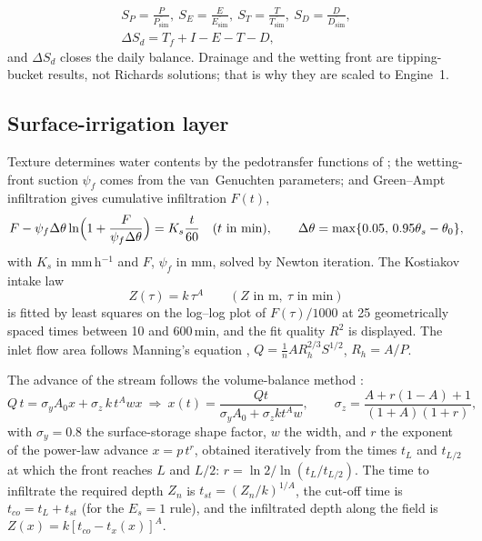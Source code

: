 \documentclass[preprint,12pt]{elsarticle}
\begin{document}
\begin{equation}
\begin{gathered}S_P=\frac{P}{\overline{P_{\mathrm{sim}}}},\ S_E=\frac{E}{\overline{E_{\mathrm{sim}}}},\ S_T=\frac{T}{\overline{T_{\mathrm{sim}}}},\ S_D=\frac{D}{\overline{D_{\mathrm{sim}}}},\\ \Delta S_d=T_f+I-E-T-D,\end{gathered}
\label{eq:scale}
\end{equation}
and $\Delta S_d$ closes the daily balance. Drainage and the wetting front are tipping-bucket results, not Richards solutions; that is why they are scaled to Engine~1.

\subsection{Surface-irrigation layer}
\label{sec:surf}
Texture determines water contents by the pedotransfer functions of \cite{Saxton2006}; the wetting-front suction $\psi_f$ comes from the van~Genuchten parameters; and Green--Ampt infiltration \cite{GreenAmpt1911} gives cumulative infiltration $F(t)$,
\begin{equation}
F-\psi_f\Delta\theta\ln\Bigl(1+\frac{F}{\psi_f\Delta\theta}\Bigr)=K_s\frac{t}{60}\quad(t\text{ in min}),\qquad \Delta\theta=\max\{0.05,\,0.95\theta_s-\theta_0\},
\label{eq:GA}
\end{equation}
with $K_s$ in mm\,h$^{-1}$ and $F$, $\psi_f$ in mm, solved by Newton iteration. The Kostiakov intake law \cite{Kostiakov1932}
\begin{equation}
Z(\tau)=k\,\tau^{A}\qquad(Z\text{ in m},\ \tau\text{ in min})
\label{eq:kost}
\end{equation}
is fitted by least squares on the log--log plot of $F(\tau)/1000$ at 25 geometrically spaced times between 10 and 600\,min, and the fit quality $R^2$ is displayed. The inlet flow area follows Manning's equation \cite{Manning1891}, $Q=\frac1n AR_h^{2/3}S^{1/2}$, $R_h=A/P$.

The advance of the stream follows the volume-balance method \cite{Walker1987,Elliott1982}:
\begin{equation}
Q\,t=\sigma_y A_0x+\sigma_z\,k\,t^{A}wx\ \Longrightarrow\ x(t)=\frac{Qt}{\sigma_yA_0+\sigma_zkt^{A}w},\qquad \sigma_z=\frac{A+r(1-A)+1}{(1+A)(1+r)},
\label{eq:vb}
\end{equation}
with $\sigma_y=0.8$ the surface-storage shape factor, $w$ the width, and $r$ the exponent of the power-law advance $x=p\,t^{r}$, obtained iteratively from the times $t_L$ and $t_{L/2}$ at which the front reaches $L$ and $L/2$: $r=\ln2/\ln(t_L/t_{L/2})$. The time to infiltrate the required depth $Z_n$ is $t_{st}=(Z_n/k)^{1/A}$, the cut-off time is $t_{co}=t_L+t_{st}$ (for the $E_s=1$ rule), and the infiltrated depth along the field is $Z(x)=k[t_{co}-t_x(x)]^{A}$.
\end{document}
